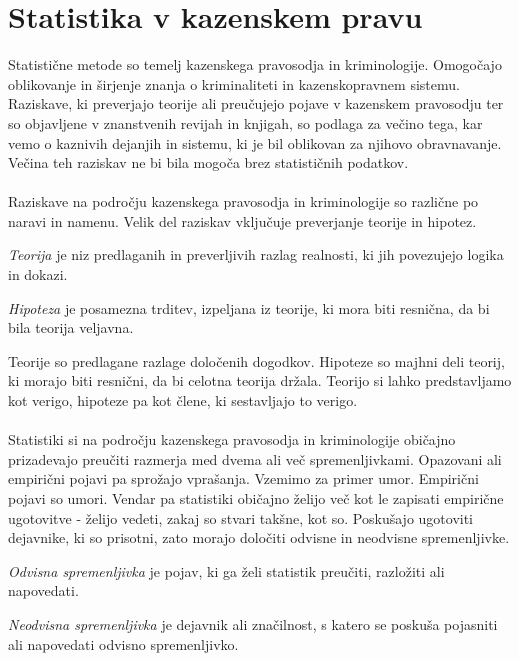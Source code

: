 \documentclass[fin1, tisk]{fmfdelo}
\theoremstyle{definition}
\theoremstyle{trditev}
\theoremstyle{izrek}
\begin{document}
\section{Statistika v kazenskem pravu}
Statistične metode so temelj kazenskega pravosodja in kriminologije. Omogočajo oblikovanje in širjenje znanja o kriminaliteti in kazenskopravnem 
sistemu. Raziskave, ki preverjajo teorije ali preučujejo pojave v kazenskem pravosodju ter so objavljene v znanstvenih revijah in knjigah, so 
podlaga za večino tega, kar vemo o kaznivih dejanjih in sistemu, ki je bil oblikovan za njihovo obravnavanje. Večina teh raziskav ne bi bila mogoča 
brez statističnih podatkov.\\\\
Raziskave na področju kazenskega pravosodja in kriminologije so različne po naravi in namenu. Velik del raziskav vključuje preverjanje teorije 
in hipotez. 
\begin{definicija}
    \textit{Teorija} je niz predlaganih in preverljivih razlag realnosti, ki jih povezujejo logika in dokazi.
\end{definicija}
\begin{definicija}
    \textit{Hipoteza} je posamezna trditev, izpeljana iz teorije, ki mora biti resnična, da bi bila teorija veljavna.
\end{definicija}
Teorije so predlagane razlage določenih dogodkov. Hipoteze so majhni deli teorij, ki morajo biti resnični, da bi celotna teorija držala. Teorijo 
si lahko predstavljamo kot verigo, hipoteze pa kot člene, ki sestavljajo to verigo.\\\\
Statistiki si na področju kazenskega pravosodja in kriminologije običajno prizadevajo preučiti razmerja med dvema ali več spremenljivkami. 
Opazovani ali empirični pojavi pa sprožajo vprašanja. Vzemimo za primer umor. Empirični pojavi so umori. Vendar pa statistiki običajno želijo več kot 
le zapisati empirične ugotovitve - želijo vedeti, zakaj so stvari takšne, kot so. 
Poskušajo ugotoviti dejavnike, ki so prisotni, zato morajo določiti odvisne in neodvisne spremenljivke.
\begin{definicija}
    \textit{Odvisna spremenljivka} je pojav, ki ga želi statistik preučiti, razložiti ali napovedati.
\end{definicija}
\begin{definicija}
    \textit{Neodvisna spremenljivka} je dejavnik ali značilnost, s katero se poskuša pojasniti ali napovedati odvisno spremenljivko.
\end{definicija}
\end{document}
